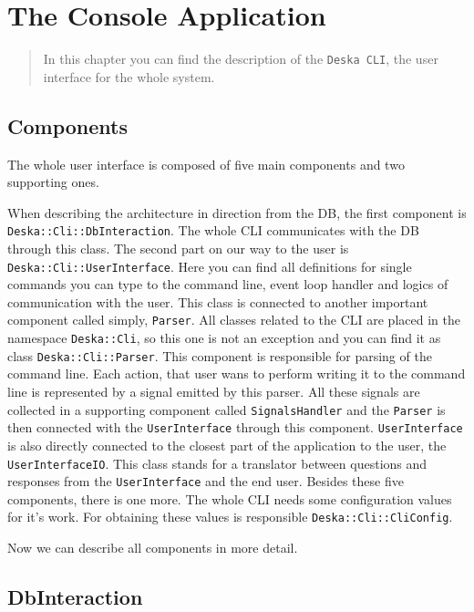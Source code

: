 \documentclass[deska]{subfiles}
\begin{document}
\chapter{The Console Application}
\label{sec:cli-app}

\begin{abstract}

In this chapter you can find the description of the {\tt Deska CLI}, the user interface for the whole system.

\end{abstract}

\section{Components}

The whole user interface is composed of five main components and two supporting ones.

When describing the architecture in direction from the DB, the first component is {\tt Deska::Cli::DbInteraction}. The 
whole CLI communicates with the DB through this class. The second part on our way to the user is {\tt Deska::Cli::UserInterface}.
Here you can find all definitions for single commands you can type to the command line, 
event loop handler and logics of communication with the user. This class is connected to another important component 
called simply, {\tt Parser}. All classes related to the CLI are placed in the namespace {\tt Deska::Cli}, so this one is not an 
exception and you can find it as class {\tt Deska::Cli::Parser}. This component is responsible for parsing of the 
command line. Each action, that user wans to perform writing it to the command line is represented by a signal emitted 
by this parser. All these signals are collected in a supporting component called {\tt SignalsHandler} and the {\tt Parser}
is then connected with the {\tt UserInterface} through this component. {\tt UserInterface} is also directly 
connected to the closest part of the application to the user, the {\tt UserInterfaceIO}. This class stands for a 
translator between questions and responses from the {\tt UserInterface} and the end user. Besides these five 
components, there is one more. The whole CLI needs some configuration values for it's work. For obtaining these values 
is responsible {\tt Deska::Cli::CliConfig}.

Now we can describe all components in more detail.

\section{DbInteraction}
\end{document}
